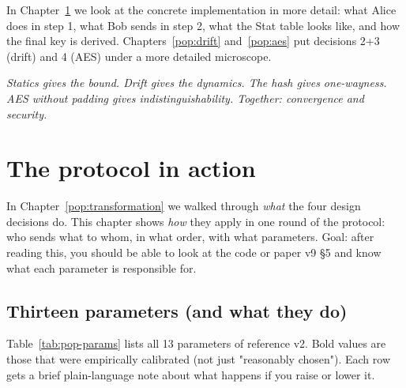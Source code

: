 \documentclass[11pt,a4paper]{article}
\begin{document}
In Chapter~\ref{pop:protocol} we look at the concrete implementation in more detail: what Alice does in step 1, what Bob sends in step 2, what the Stat table looks like, and how the final key is derived. Chapters~\ref{pop:drift} and~\ref{pop:aes} put decisions 2+3 (drift) and 4 (AES) under a more detailed microscope.

\medskip
\noindent\textit{Statics gives the bound. Drift gives the dynamics. The hash gives one-wayness. AES without padding gives indistinguishability. Together: convergence and security.}

\section{The protocol in action}\label{pop:protocol}

In Chapter~\ref{pop:transformation} we walked through \emph{what} the four design decisions do. This chapter shows \emph{how} they apply in one round of the protocol: who sends what to whom, in what order, with what parameters. Goal: after reading this, you should be able to look at the code or paper v9 §5 and know what each parameter is responsible for.

\subsection{Thirteen parameters (and what they do)}

Table~\ref{tab:pop-params} lists all 13 parameters of reference v2. Bold values are those that were empirically calibrated (not just "reasonably chosen"). Each row gets a brief plain-language note about what happens if you raise or lower it.
\end{document}
